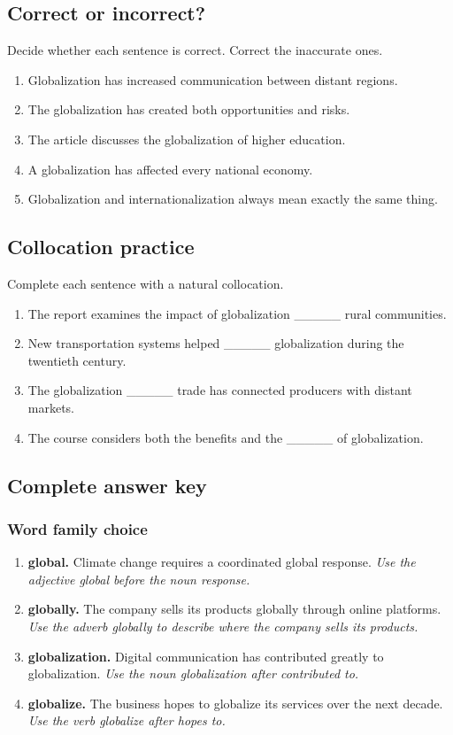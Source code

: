 \documentclass[11pt]{article}
\begin{document}
\subsection{Correct or incorrect?}
Decide whether each sentence is correct. Correct the inaccurate ones.

\begin{enumerate}
  \item Globalization has increased communication between distant regions.
  \item The globalization has created both opportunities and risks.
  \item The article discusses the globalization of higher education.
  \item A globalization has affected every national economy.
  \item Globalization and internationalization always mean exactly the same thing.
\end{enumerate}

\subsection{Collocation practice}
Complete each sentence with a natural collocation.

\begin{enumerate}
  \item The report examines the impact of globalization \_\_\_\_\_ rural communities.
  \item New transportation systems helped \_\_\_\_\_ globalization during the twentieth century.
  \item The globalization \_\_\_\_\_ trade has connected producers with distant markets.
  \item The course considers both the benefits and the \_\_\_\_\_ of globalization.
\end{enumerate}

\subsection{Complete answer key}
\subsubsection{Word family choice}
\begin{enumerate}
  \item \textbf{global.} Climate change requires a coordinated global response. \emph{Use the adjective global before the noun response.}
  \item \textbf{globally.} The company sells its products globally through online platforms. \emph{Use the adverb globally to describe where the company sells its products.}
  \item \textbf{globalization.} Digital communication has contributed greatly to globalization. \emph{Use the noun globalization after contributed to.}
  \item \textbf{globalize.} The business hopes to globalize its services over the next decade. \emph{Use the verb globalize after hopes to.}
\end{enumerate}
\end{document}
